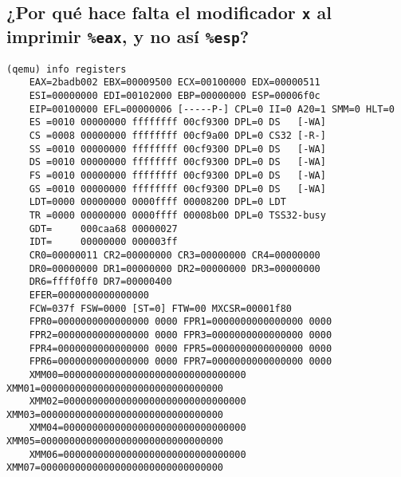 \documentclass[a4paper]{article}
\newcommand{\code}[1]{\colorbox{light-gray}{\texttt{#1}}}
\begin{document}
\subsection{¿Por qué hace falta el modificador \code{x} al imprimir \code{\%eax}, y no así \code{\%esp}?}
\begin{lstlisting}[gobble=4,tabsize=4]
    (qemu) info registers
    EAX=2badb002 EBX=00009500 ECX=00100000 EDX=00000511
    ESI=00000000 EDI=00102000 EBP=00000000 ESP=00006f0c
    EIP=00100000 EFL=00000006 [-----P-] CPL=0 II=0 A20=1 SMM=0 HLT=0
    ES =0010 00000000 ffffffff 00cf9300 DPL=0 DS   [-WA]
    CS =0008 00000000 ffffffff 00cf9a00 DPL=0 CS32 [-R-]
    SS =0010 00000000 ffffffff 00cf9300 DPL=0 DS   [-WA]
    DS =0010 00000000 ffffffff 00cf9300 DPL=0 DS   [-WA]
    FS =0010 00000000 ffffffff 00cf9300 DPL=0 DS   [-WA]
    GS =0010 00000000 ffffffff 00cf9300 DPL=0 DS   [-WA]
    LDT=0000 00000000 0000ffff 00008200 DPL=0 LDT
    TR =0000 00000000 0000ffff 00008b00 DPL=0 TSS32-busy
    GDT=     000caa68 00000027
    IDT=     00000000 000003ff
    CR0=00000011 CR2=00000000 CR3=00000000 CR4=00000000
    DR0=00000000 DR1=00000000 DR2=00000000 DR3=00000000
    DR6=ffff0ff0 DR7=00000400
    EFER=0000000000000000
    FCW=037f FSW=0000 [ST=0] FTW=00 MXCSR=00001f80
    FPR0=0000000000000000 0000 FPR1=0000000000000000 0000
    FPR2=0000000000000000 0000 FPR3=0000000000000000 0000
    FPR4=0000000000000000 0000 FPR5=0000000000000000 0000
    FPR6=0000000000000000 0000 FPR7=0000000000000000 0000
    XMM00=00000000000000000000000000000000 XMM01=00000000000000000000000000000000
    XMM02=00000000000000000000000000000000 XMM03=00000000000000000000000000000000
    XMM04=00000000000000000000000000000000 XMM05=00000000000000000000000000000000
    XMM06=00000000000000000000000000000000 XMM07=00000000000000000000000000000000
\end{lstlisting}
\end{document}
